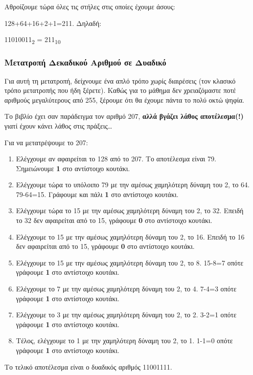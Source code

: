 Αθροίζουμε τώρα όλες τις στήλες στις οποίες έχουμε άσους:

128+64+16+2+1=211. Δηλαδή:

11010011\textsubscript{2} = 211\textsubscript{10}

\subsubsection*{Μετατροπή Δεκαδικού Αριθμού σε Δυαδικό}

Για αυτή τη μετατροπή, δείχνουμε ένα απλό τρόπο χωρίς διαιρέσεις (τον κλασικό τρόπο μετατροπής που ήδη ξέρετε). Καθώς για το μάθημα δεν χρειαζόμαστε ποτέ αριθμούς μεγαλύτερους από 255, ξέρουμε ότι θα έχουμε πάντα το πολύ οκτώ ψηφία.

Το βιβλίο έχει σαν παράδειγμα τον αριθμό 207, \textbf{αλλά βγάζει λάθος αποτέλεσμα(!)} γιατί έχουν κάνει λάθος στις πράξεις\ldots

Για να μετατρέψουμε το 207:

\begin{enumerate}
\item Ελέγχουμε αν αφαιρείται το 128 από το 207. Το αποτέλεσμα είναι 79. Σημειώνουμε \textbf{1} στο αντίστοιχο κουτάκι.
\item Ελέγχουμε τώρα το υπόλοιπο 79 με την αμέσως χαμηλότερη δύναμη του 2, το 64. 79-64=15. Γράφουμε και πάλι \textbf{1} στο αντίστοιχο κουτάκι.
\item Ελέγχουμε τώρα το 15 με την αμέσως χαμηλότερη δύναμη του 2, το 32. Επειδή το 32 δεν αφαιρείται από το 15, γράφουμε \textbf{0} στο αντίστοιχο κουτάκι.
\item Ελέγχουμε το 15 με την αμέσως χαμηλότερη δύναμη του 2, το 16. Επειδή το 16 δεν αφαιρείται από το 15, γράφουμε \textbf{0} στο αντίστοιχο κουτάκι.
\item Ελέγχουμε το 15 με την αμέσως χαμηλότερη δύναμη του 2, το 8. 15-8=7 οπότε γράφουμε \textbf{1} στο αντίστοιχο κουτάκι.
\item Ελέγχουμε το 7 με την αμέσως χαμηλότερη δύναμη του 2, το 4. 7-4=3 οπότε γράφουμε \textbf{1} στο αντίστοιχο κουτάκι.
\item Ελέγχουμε το 3 με την αμέσως χαμηλότερη δύναμη του 2, το 2. 3-2=1 οπότε γράφουμε \textbf{1} στο αντίστοιχο κουτάκι.
\item Τέλος, ελέγχουμε το 1 με την χαμηλότερη δύναμη του 2, το 1. 1-1=0 οπότε γράφουμε \textbf{1} στο αντίστοιχο κουτάκι.
\end{enumerate}

Το τελικό αποτέλεσμα είναι ο δυαδικός αριθμός 11001111.

